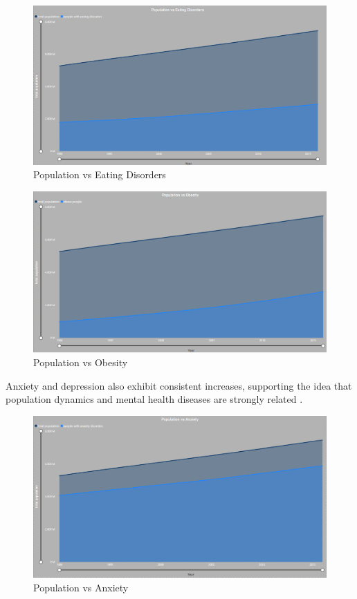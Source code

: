 \documentclass[runningheads]{llncs}
\begin{document}
\begin{figure}[ht!]
    \centering
    \includegraphics[width=\textwidth]{./imgs/Eating disorders.png}
    \caption{Population vs Eating Disorders}
    \label{fig:eatingdisorders}
\end{figure}

\clearpage

\begin{figure}[ht!]
    \centering
    \includegraphics[width=\textwidth]{./imgs/obes.png}
    \caption{Population vs Obesity}
    \label{fig:obesity}
\end{figure}

Anxiety and depression also exhibit consistent increases, supporting the idea that population dynamics and mental health diseases are strongly related \cite{bmjpsychiatry2020}.

\begin{figure}[ht!]
    \centering
    \includegraphics[width=\textwidth]{./imgs/anxiety.png}
    \caption{Population vs Anxiety}
    \label{fig:anxiety}
\end{figure}
\end{document}
